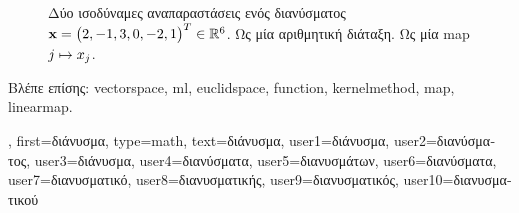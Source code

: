 {{\begin{figure}[H]
\begin{minipage}{0.48\textwidth}
			\end{minipage}
			{
			\caption{\foreignlanguage{greek}{Δύο ισοδύναμες αναπαραστάσεις ενός διανύσματος} 
			${\bf x}= \big( 2, -1, 3, 0, -2, 1 \big)^{T} \in \mathbb{R}^{6}$.
			 \foreignlanguage{greek}{Ως μία αριθμητική διάταξη.} 
			 \foreignlanguage{greek}{Ως μία} \gls{map} $j \mapsto x_j$.}
			\label{fig:vector-function-dual_dict} }
		\end{figure}
		\foreignlanguage{greek}{Βλέπε επίσης:} \gls{vectorspace}, \gls{ml}, \gls{euclidspace}, \gls{function}, 
		\gls{kernelmethod}, \gls{map}, \gls{linearmap}.},
	first={\foreignlanguage{greek}{διάνυσμα}},
	type=math,
	text={\foreignlanguage{greek}{διάνυσμα}},
	user1={\foreignlanguage{greek}{διάνυσμα}}, %
	user2={\foreignlanguage{greek}{διανύσματος}}, %
	user3={\foreignlanguage{greek}{διάνυσμα}}, %
	user4={\foreignlanguage{greek}{διανύσματα}}, %
	user5={\foreignlanguage{greek}{διανυσμάτων}}, %
	user6={\foreignlanguage{greek}{διανύσματα}}, %
	user7={\foreignlanguage{greek}{διανυσματικό}}, %
	user8={\foreignlanguage{greek}{διανυσματικής}}, %
	user9={\foreignlanguage{greek}{διανυσματικός}}, %
	user10={\foreignlanguage{greek}{διανυσματικού}} %
}

